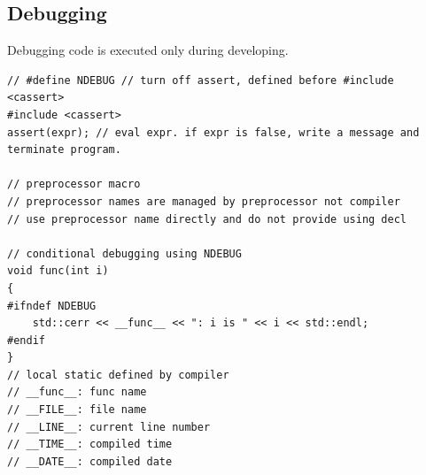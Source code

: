 \documentclass{blog}
\begin{document}
\subsection{Debugging}
\begin{definition}
    Debugging code is executed only during developing.
    \begin{verbatim}
// #define NDEBUG // turn off assert, defined before #include <cassert>
#include <cassert>
assert(expr); // eval expr. if expr is false, write a message and terminate program.

// preprocessor macro
// preprocessor names are managed by preprocessor not compiler
// use preprocessor name directly and do not provide using decl

// conditional debugging using NDEBUG
void func(int i)
{
#ifndef NDEBUG
    std::cerr << __func__ << ": i is " << i << std::endl;
#endif
}
// local static defined by compiler
// __func__: func name
// __FILE__: file name
// __LINE__: current line number
// __TIME__: compiled time
// __DATE__: compiled date
\end{verbatim}
\end{definition}
\end{document}
